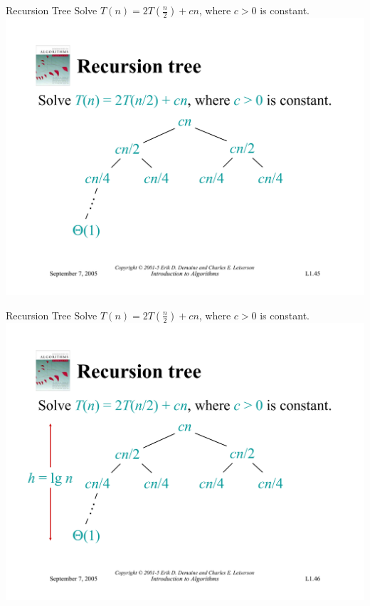 \documentclass{beamer}
\begin{document}
\begin{frame}{Recursion Tree}
    Solve $T(n) = 2T(\frac{n}{2}) + cn$, where $c > 0$ is constant.\\
    \vspace{5mm}
    \centering
    \includegraphics[width=\textwidth, trim={0.49cm 1.25cm 0.7cm 5.75cm}, clip]{pages/lec1_45}
\end{frame}
\begin{frame}{Recursion Tree}
    Solve $T(n) = 2T(\frac{n}{2}) + cn$, where $c > 0$ is constant.\\
    \vspace{5mm}
    \centering
    \includegraphics[width=\textwidth, trim={0.49cm 1.25cm 0.7cm 5.75cm}, clip]{pages/lec1_46}
\end{frame}
\end{document}
